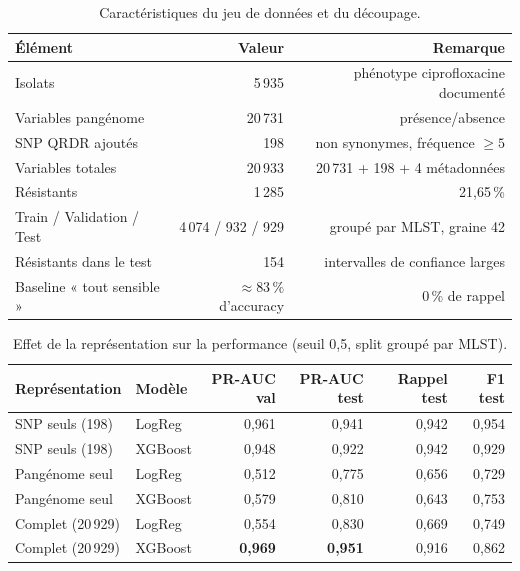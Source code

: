 \documentclass[11pt,a4paper]{article}
\begin{document}
\begin{table}[H]
\centering
\caption{Caractéristiques du jeu de données et du découpage.}
\label{tab:chiffres}
\small
\begin{tabular}{lrr}
\toprule
\textbf{Élément} & \textbf{Valeur} & \textbf{Remarque} \\
\midrule
Isolats & 5\,935 & phénotype ciprofloxacine documenté \\
Variables pangénome & 20\,731 & présence/absence \\
SNP QRDR ajoutés & 198 & non synonymes, fréquence $\geq 5$ \\
Variables totales & 20\,933 & 20\,731 + 198 + 4 métadonnées \\
Résistants & 1\,285 & 21,65\,\% \\
Train / Validation / Test & 4\,074 / 932 / 929 & groupé par MLST, graine 42 \\
Résistants dans le test & 154 & intervalles de confiance larges \\
Baseline « tout sensible » & $\approx 83\,\%$ d'accuracy & 0\,\% de rappel \\
\bottomrule
\end{tabular}
\end{table}

\begin{table}[H]
\centering
\caption{Effet de la représentation sur la performance (seuil 0,5, split groupé par MLST).}
\label{tab:resultats}
\small
\begin{tabular}{llrrrr}
\toprule
\textbf{Représentation} & \textbf{Modèle} & \textbf{PR-AUC val} & \textbf{PR-AUC test} & \textbf{Rappel test} & \textbf{F1 test} \\
\midrule
SNP seuls (198) & LogReg & 0,961 & 0,941 & 0,942 & 0,954 \\
SNP seuls (198) & XGBoost & 0,948 & 0,922 & 0,942 & 0,929 \\
Pangénome seul & LogReg & 0,512 & 0,775 & 0,656 & 0,729 \\
Pangénome seul & XGBoost & 0,579 & 0,810 & 0,643 & 0,753 \\
Complet (20\,929) & LogReg & 0,554 & 0,830 & 0,669 & 0,749 \\
Complet (20\,929) & XGBoost & \textbf{0,969} & \textbf{0,951} & 0,916 & 0,862 \\
\bottomrule
\end{tabular}
\end{table}
\end{document}
